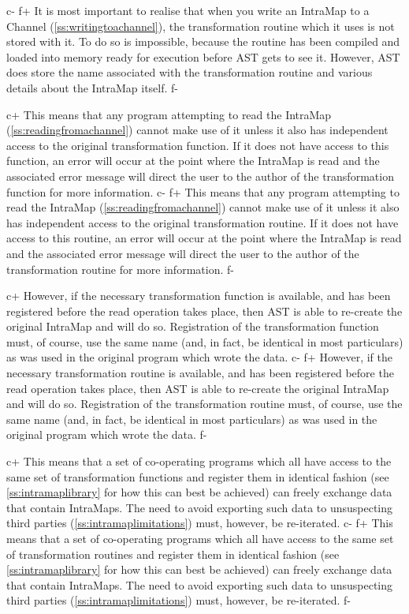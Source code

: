 \documentclass[twoside,11pt]{article}
\newcommand{\secref}[1]{\S\ref{#1}}
\renewcommand{\secref}[1]{\ref{#1}}
\begin{document}
c-
f+
It is most important to realise that when you write an IntraMap to a
Channel (\secref{ss:writingtoachannel}), the transformation routine
which it uses is not stored with it. To do so is impossible, because
the routine has been compiled and loaded into memory ready for
execution before AST gets to see it. However, AST does store the name
associated with the transformation routine and various details about
the IntraMap itself.
f-

c+
This means that any program attempting to read the IntraMap
(\secref{ss:readingfromachannel}) cannot make use of it unless it also
has independent access to the original transformation function. If it
does not have access to this function, an error will occur at the
point where the IntraMap is read and the associated error message will
direct the user to the author of the transformation function for more
information.
c-
f+
This means that any program attempting to read the IntraMap
(\secref{ss:readingfromachannel}) cannot make use of it unless it also
has independent access to the original transformation routine. If it
does not have access to this routine, an error will occur at the point
where the IntraMap is read and the associated error message will
direct the user to the author of the transformation routine for more
information.
f-

c+
However, if the necessary transformation function is available, and
has been registered before the read operation takes place, then AST is
able to re-create the original IntraMap and will do so. Registration
of the transformation function must, of course, use the same name
(and, in fact, be identical in most particulars) as was used in the
original program which wrote the data.
c-
f+
However, if the necessary transformation routine is available, and
has been registered before the read operation takes place, then AST is
able to re-create the original IntraMap and will do so. Registration
of the transformation routine must, of course, use the same name
(and, in fact, be identical in most particulars) as was used in the
original program which wrote the data.
f-

c+
This means that a set of co-operating programs which all have access
to the same set of transformation functions and register them in
identical fashion (see \secref{ss:intramaplibrary} for how this can
best be achieved) can freely exchange data that contain IntraMaps. The
need to avoid exporting such data to unsuspecting third parties
(\secref{ss:intramaplimitations}) must, however, be re-iterated.
c-
f+
This means that a set of co-operating programs which all have access
to the same set of transformation routines and register them in
identical fashion (see \secref{ss:intramaplibrary} for how this can
best be achieved) can freely exchange data that contain IntraMaps. The
need to avoid exporting such data to unsuspecting third parties
(\secref{ss:intramaplimitations}) must, however, be re-iterated.
f-
\end{document}
